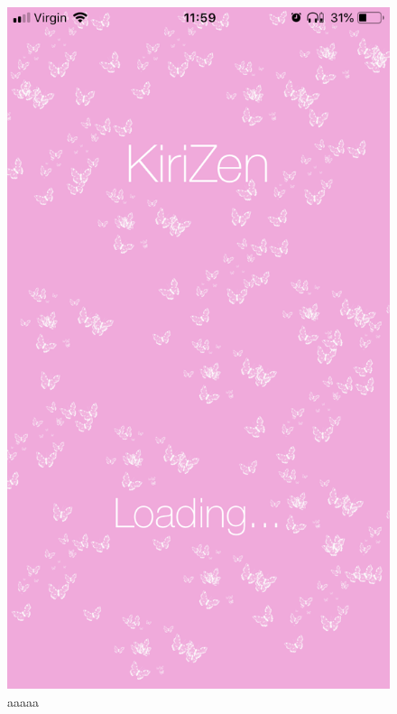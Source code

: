 \documentclass[11pt]{article}
\begin{document}
                    \begin{figure}[!ht]
                        \begin{minipage}{0.45\textwidth}
                            \centering \includegraphics[width=0.7\linewidth]{KiriZen/launchPage.png}
                            \caption{aaaaa}
                            \label{fig:kiriZen-launch}
                        \end{minipage}\hfill
                        \begin{minipage}{0.45\textwidth}
                            \centering

\end{minipage}
\end{figure}
\end{document}
